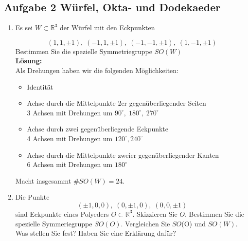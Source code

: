 \documentclass[11pt,a4paper,ngerman]{article}
\newcommand{\R}{\mathbb{R}}
\begin{document}
\pagebreak

\subsection*{Aufgabe 2 \mdseries Würfel, Okta- und Dodekaeder}

\begin{enumerate}[\bfseries (a)]

\item Es sei $W \subset \R ^3$ der Würfel mit den Eckpunkten

$$
(1,1,\pm 1), \; (-1,1, \pm 1), \; (-1, -1, \pm 1), \; (1, -1, \pm 1)
$$
Bestimmen Sie die spezielle Symmetriegruppe $SO(W)$\\


\textbf{Lösung:}\\
Als Drehungen haben wir die folgenden Möglichkeiten:
\begin{itemize}
\item Identität
\item Achse durch die Mittelpunkte 2er gegenüberliegender Seiten\\
3 Achsen mit Drehungen um $90^\circ, \; 180^\circ , \; 270^\circ$
\item Achse durch zwei gegenüberliegende Eckpunkte\\
4 Achsen mit Drehungen um $120^\circ , 240^\circ$
\item Achse durch die Mittelpunkte zweier gegenüberliegender Kanten\\
6 Achsen mit Drehungen um $180^\circ$
\end{itemize}

Macht insgesammt $\# SO(W) = 24$.

\item Die Punkte
$$
(\pm 1, 0 , 0), \; (0, \pm 1, 0), \; (0,0,\pm 1)
$$
sind Eckpunkte eines Polyeders $O \subset \R ^ 3$. Skizzieren Sie $O$. Bestimmen Sie die spezielle Symmeriegruppe $SO(O)$. Vergleichen Sie $SO$(O) und $SO(W)$. Was stellen Sie fest? Haben Sie eine Erklärung dafür?\\


\end{enumerate}
\end{document}
